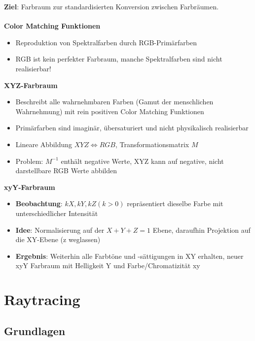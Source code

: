 \documentclass[10pt,a4paper]{article}
\begin{document}
	\textbf{Ziel}: Farbraum zur standardisierten Konversion zwischen Farbräumen.\\\\
	\textbf{Color Matching Funktionen}
		\begin{itemize}
			\item Reproduktion von Spektralfarben durch RGB-Primärfarben
			\item RGB ist kein perfekter Farbraum, manche Spektralfarben sind nicht realisierbar!
		\end{itemize}		
	\textbf{XYZ-Farbraum}
		\begin{itemize}
			\item Beschreibt alle wahrnehmbaren Farben (\glqq Gamut der menschlichen Wahrnehmung\grqq) mit rein positiven Color Matching Funktionen
			\item Primärfarben sind imaginär, übersaturiert und nicht physikalisch realisierbar
			\item Lineare Abbildung $XYZ \Leftrightarrow RGB$, Transformationsmatrix $M$
			\item Problem: $M^{-1}$ enthält negative Werte, XYZ kann auf negative, nicht darstellbare RGB Werte abbilden
		\end{itemize}
	\textbf{xyY-Farbraum}
		\begin{itemize}
			\item \textbf{Beobachtung}: $kX, kY, kZ (k > 0)$ repräsentiert dieselbe Farbe mit unterschiedlicher Intensität
			\item \textbf{Idee}: Normalisierung auf der $X + Y + Z = 1$ Ebene, daraufhin Projektion auf die XY-Ebene (z weglassen)
			\item \textbf{Ergebnis}: Weiterhin alle Farbtöne und -sättigungen in XY erhalten, neuer xyY Farbraum mit Helligkeit Y und Farbe/Chromatizität xy
		\end{itemize}

	\newpage
	\section{Raytracing}
	\label{rt:sec:raytracing}

	\subsection{Grundlagen}
	\label{rt:sub:grundlagen}
\end{document}
